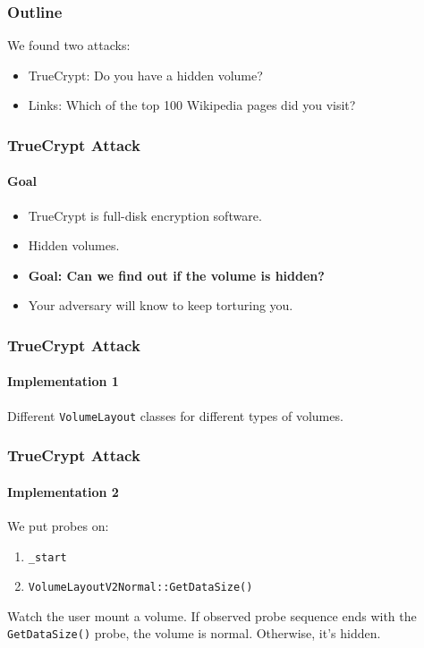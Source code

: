 \documentclass{beamer}
\begin{document}
\begin{frame}
    \frametitle{Outline}

    We found two attacks:
    \begin{itemize}
        \item TrueCrypt: Do you have a hidden volume?
        \item Links: Which of the top 100 Wikipedia pages did you visit?
    \end{itemize}
\end{frame}


\begin{frame}
    \frametitle{TrueCrypt Attack}
    \framesubtitle{Goal}

    \begin{itemize}
        \item TrueCrypt is full-disk encryption software.
        \item Hidden volumes.
        \item \textbf{Goal: Can we find out if the volume is hidden?}
        \item Your adversary will know to keep torturing you.
    \end{itemize}

\end{frame}

\begin{frame}
    \frametitle{TrueCrypt Attack}
    \framesubtitle{Implementation 1}

    Different \texttt{VolumeLayout} classes for different types of volumes.

\end{frame}

\begin{frame}
    \frametitle{TrueCrypt Attack}
    \framesubtitle{Implementation 2}

    We put probes on:

    \begin{enumerate}
        \item \texttt{\_start}
        \item \texttt{VolumeLayoutV2Normal::GetDataSize()}
    \end{enumerate}

    Watch the user mount a volume. If observed probe sequence ends with the
    \texttt{GetDataSize()} probe, the volume is normal. Otherwise, it's hidden.

\end{frame}
\end{document}
